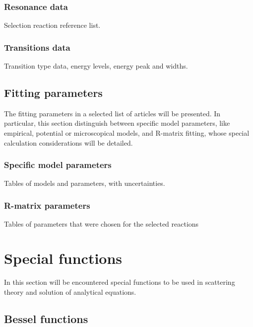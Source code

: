 \documentclass[openany]{book}
\begin{document}
\subsection{Resonance data}  \label{sub:ResonanceData}

Selection reaction reference list.

\subsection{Transitions data} \label{sub:Transitions2Data}

Transition type data, energy levels, energy peak and widths.

\section{Fitting parameters} \label{sec:fittingParams}

The fitting parameters in a selected list of articles will be presented. In particular, this section distinguish between specific model parameters, like empirical, potential or microscopical models, and R-matrix fitting, whose special calculation considerations will be detailed.

\subsection{Specific model parameters} \label{sub:modelParameters}

Tables of models and parameters, with uncertainties. 

\subsection{R-matrix parameters} \label{sub:rmatrixParameters}

Tables of parameters that were chosen for the selected reactions

\chapter{Special functions} \label{ap:specialFunctions}

In this section will be encountered special functions to be used in scattering theory and solution of analytical equations.

\section{Bessel functions} \label{sec:bessel}
\end{document}
